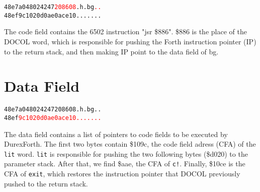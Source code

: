 \begin{alltt}
48e7  a0 48 02 42 47 \textcolor{red}{20 86 08} .h.bg \textcolor{red}{..}
48ef  9c 10 20 d0 ae 0a ce 10 .. .....
\end{alltt}

The code field contains the 6502 instruction "jsr \$886". \$886 is the place of the DOCOL word, which is responsible for pushing the Forth instruction pointer (IP) to the return stack, and then making IP point to the data field of bg.

\section{Data Field}

\begin{alltt}
48e7  a0 48 02 42 47 20 86 08 .h.bg ..
48ef  \textcolor{red}{9c 10 20 d0 ae 0a ce 10 .. .....}
\end{alltt}

The data field contains a list of pointers to code fields to be executed by DurexForth. The first two bytes contain \$109c, the code field adress (CFA) of the \texttt{lit} word. \texttt{lit} is responsible for pushing the two following bytes (\$d020) to the parameter stack. After that, we find \$aae, the CFA of \texttt{c!}. Finally, \$10ce is the CFA of \texttt{exit}, which restores the instruction pointer that DOCOL previously pushed to the return stack.
